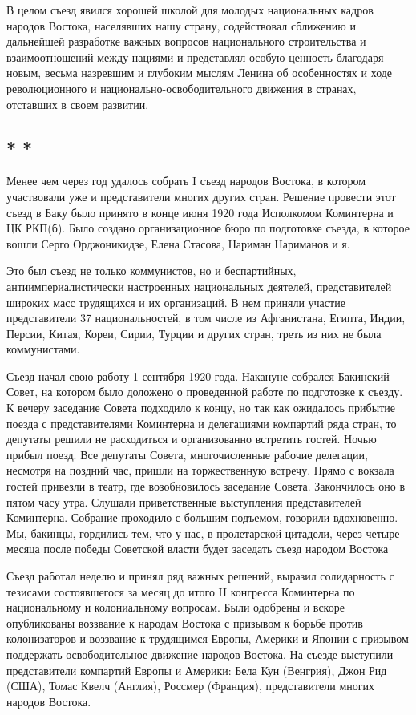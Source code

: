 \documentclass[12pt, a4paper, openany]{book}
\begin{document}
В целом съезд явился хорошей школой для молодых национальных кадров народов Востока, населявших нашу страну, содействовал сближению и дальнейшей разработке важных вопросов национального строительства и взаимоотношений между нациями и представлял особую ценность благодаря новым, весьма назревшим и глубоким мыслям Ленина об особенностях и ходе революционного и национально-освободительного движения в странах, отставших в своем развитии.

\subsection*{\center * * *}

Менее чем через год удалось собрать I съезд народов Востока, в котором участвовали уже и представители многих других стран. Решение провести этот съезд в Баку было принято в конце июня 1920 года Исполкомом Коминтерна и ЦК РКП(б). Было создано организационное бюро по подготовке съезда, в которое вошли Серго Орджоникидзе, Елена Стасова, Нариман Нариманов и я.

Это был съезд не только коммунистов, но и беспартийных, антиимпериалистически настроенных национальных деятелей, представителей широких масс трудящихся и их организаций. В нем приняли участие представители 37 национальностей, в том числе из Афганистана, Египта, Индии, Персии, Китая, Кореи, Сирии, Турции и других стран, треть из них не была коммунистами.

Съезд начал свою работу 1 сентября 1920 года. Накануне собрался Бакинский Совет, на котором было доложено о проведенной работе по подготовке к съезду. К вечеру заседание Совета подходило к концу, но так как ожидалось прибытие поезда с представителями Коминтерна и делегациями компартий ряда стран, то депутаты решили не расходиться и организованно встретить гостей. Ночью прибыл поезд. Все депутаты Совета, многочисленные рабочие делегации, несмотря на поздний час, пришли на торжественную встречу. Прямо с вокзала гостей привезли в театр, где возобновилось заседание Совета. Закончилось оно в пятом часу утра. Слушали приветственные выступления представителей Коминтерна. Собрание проходило с большим подъемом, говорили вдохновенно. Мы, бакинцы, гордились тем, что у нас, в пролетарской цитадели, через четыре месяца после победы Советской власти будет заседать съезд народом Востока

Съезд работал неделю и принял ряд важных решений, выразил солидарность с тезисами состоявшегося за месяц до итого II конгресса Коминтерна по национальному и колониальному вопросам. Были одобрены и вскоре опубликованы воззвание к народам Востока с призывом к борьбе против колонизаторов и воззвание к трудящимся Европы, Америки и Японии с призывом поддержать освободительное движение народов Востока. На съезде выступили представители компартий Европы и Америки: Бела Кун (Венгрия), Джон Рид (США), Томас Квелч (Англия), Россмер (Франция), представители многих народов Востока.
\end{document}
